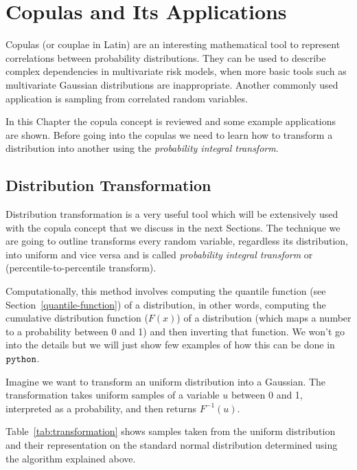 \chapter{Copulas and Its Applications}

Copulas (or couplae in Latin) are an interesting mathematical tool to represent correlations between probability distributions. They can be used to describe complex dependencies in multivariate risk models, when more basic tools such as multivariate Gaussian distributions are inappropriate. Another commonly used application is sampling from correlated random variables.

In this Chapter the copula concept is reviewed and some example applications are shown. 
Before going into the copulas we need to learn how to transform a distribution into another using the \emph{probability integral transform}. 

\section{Distribution Transformation}\label{distribution-transformation}

Distribution transformation is a very useful tool which will be
extensively used with the copula concept that we discuss in the next
Sections. The technique we are going to outline transforms every random
variable, regardless its distribution, into uniform and vice versa and is called
\emph{probability integral transform} or (percentile-to-percentile
transform).

Computationally, this method involves computing the quantile function (see Section~\ref{quantile-function}) of
a distribution, in other words, computing the cumulative
distribution function ($F(x)$) of a distribution (which maps a number
to a probability between 0 and 1) and then inverting that
function. We won't go into the details but we will just show few
examples of how this can be done in \(\tt{python}\).

Imagine we want to transform an uniform distribution into a Gaussian.
The transformation takes uniform samples of a variable \(u\) between 0 and
1, interpreted as a probability, and then returns $F^{-1}(u)$. 

Table~\ref{tab:transformation} shows samples taken from the
uniform distribution and their representation on the standard normal
distribution determined using the algorithm explained above.

